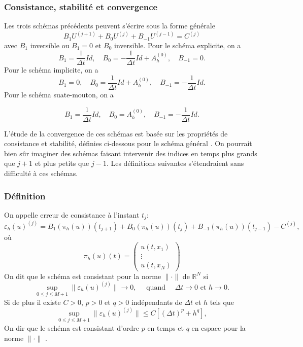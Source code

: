 \documentclass{beamer}
\begin{document}
  \begin{frame}    
  \frametitle{Consistance, stabilité et convergence}
  Les trois schémas précédents peuvent s'écrire sous la forme générale
  \[B_1U^{(j+1)} + B_0U^{(j)} + B_{-1}U^{(j-1)} = C^{(j)}\]
  avec $B_1$ inversible ou $B_1 = 0$ et $B_0$ inversible. Pour le schéma explicite, on a
\[B_1= \frac{1}{\Delta t} Id,\quad B_0=-\frac{1}{\Delta t} Id+A_h^{(0)},\quad  B_{-1}=0.\]
Pour le schéma implicite, on a
 \[B_1= 0,\quad B_0=\frac{1}{\Delta t} Id+A_h^{(0)},\quad  B_{-1}=-\frac{1}{\Delta t} Id.\]
Pour le schéma suate-mouton, on a

\[B_1= \frac{1}{\Delta t} Id ,\quad B_0=A_h^{(0)},\quad  B_{-1}=-\frac{1}{\Delta t} Id.\]

L'étude de la convergence de ces schémas est basée sur les propriétés de consistance et stabilité, définies ci-dessous pour le schéma général .
On pourrait bien sûr imaginer des schémas faisant intervenir des indices en temps plus grands que $j + 1$ et plus petits que $j - 1$. Les définitions suivantes s'étendraient sans difficulté à ces schémas.

  
  \end{frame}
  
  \begin{frame}    
  \frametitle{Définition}
  On appelle erreur de consistance à l'instant $t_j$:
  \[\varepsilon_h(u)^{(j)} = B_1(\pi_h(u))(t_{j+1})+B_0(\pi_h(u))(t_{j})+B_{-1}(\pi_h(u))(t_{j-1})-C^{(j)},\]
  où
  \[\pi_h(u)(t) = \left( \begin{array}{c}
  u(t,x_1)\\
  \vdots\\
  u(t,x_N)
  \end{array}\right)
  \]
  On dit que le schéma est consistant pour la norme $\|\cdot\|$ de $\mathbb{R}^N$ si
  \[\sup_{0\leq j \leq M+1}\|\varepsilon_h(u)^{(j)} \|\to 0,\quad\mbox{ quand }\quad \Delta t\to 0 \mbox{ et }h\to 0.\]
  Si de plus il existe $C>0$, $p>0$ et $q>0$ indépendants de $\Delta t$ et $h$ tels que
  \[\sup_{0\leq j \leq M+1}\|\varepsilon_h(u)^{(j)} \|\leq C\left[(\Delta t)^p +h^q\right],\]
  On dir que le schéma est consistant d'ordre $p$ en temps et $q$ en espace pour la norme  $\|\cdot\|$ .
   \end{frame}
   
\end{document}
